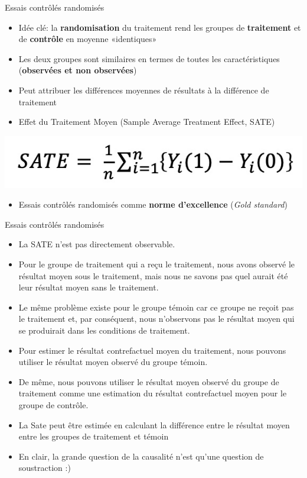 \documentclass[ignorenonframetext,]{beamer}
\providecommand{\tightlist}{%
  \setlength{\itemsep}{0pt}\setlength{\parskip}{0pt}}
\begin{document}
\begin{frame}{Essais contrôlés randomisés}
\protect\hypertarget{essais-controles-randomises}{}

\begin{itemize}
\tightlist
\item
  Idée clé: la \textbf{randomisation} du traitement rend les groupes de
  \textbf{traitement} et de \textbf{contrôle} en moyenne «identiques»
\item
  Les deux groupes sont similaires en termes de toutes les
  caractéristiques (\textbf{observées et non observées})
\item
  Peut attribuer les différences moyennes de résultats à la différence
  de traitement
\item
  Effet du Traitement Moyen (Sample Average Treatment Effect, SATE)
\end{itemize}

\includegraphics[width=0.7\linewidth]{SATE1}

\begin{itemize}
\tightlist
\item
  Essais contrôlés randomisés comme \textbf{norme d'excellence}
  (\emph{Gold standard})
\end{itemize}

\end{frame}

\begin{frame}{Essais contrôlés randomisés}
\protect\hypertarget{essais-controles-randomises-1}{}

\begin{itemize}
\tightlist
\item
  La SATE n'est pas directement observable.
\item
  Pour le groupe de traitement qui a reçu le traitement, nous avons
  observé le résultat moyen sous le traitement, mais nous ne savons pas
  quel aurait été leur résultat moyen sans le traitement.
\item
  Le même problème existe pour le groupe témoin car ce groupe ne reçoit
  pas le traitement et, par conséquent, nous n'observons pas le résultat
  moyen qui se produirait dans les conditions de traitement.
\item
  Pour estimer le résultat contrefactuel moyen du traitement, nous
  pouvons utiliser le résultat moyen observé du groupe témoin.
\item
  De même, nous pouvons utiliser le résultat moyen observé du groupe de
  traitement comme une estimation du résultat contrefactuel moyen pour
  le groupe de contrôle.
\item
  La Sate peut être estimée en calculant la différence entre le résultat
  moyen entre les groupes de traitement et témoin
\item
  En clair, la grande question de la causalité n'est qu'une question de
  soustraction :)
\end{itemize}

\end{frame}
\end{document}
